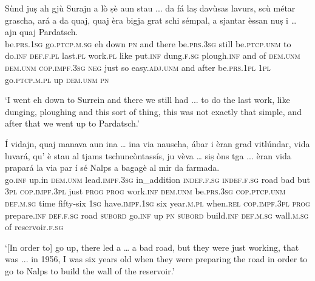 \begin{linenumbers}
\gll   Sùnd juṣ ah gjù Surajn a lò ṣè aun stau ... da fá laṣ davùsas lavurs, scù métar grascha, ará a da quaj, quaj èra bigja grat schi sémpal, a sjantar èssan nuṣ i … ajn quaj Pardatsch. \\
 be.\textsc{prs.1sg} go.\textsc{ptcp.m.sg} eh down \textsc{pn} and there be.\textsc{prs.3sg}  still be.\textsc{ptcp.unm} {} to do.\textsc{inf} \textsc{def.f.pl} last.\textsc{pl} work.\textsc{pl} like put.\textsc{inf} dung.\textsc{f.sg}  plough.\textsc{inf} and of \textsc{dem.unm} \textsc{dem.unm}  \textsc{cop.impf.3sg} \textsc{neg} just so easy.\textsc{adj.unm} and after be.\textsc{prs.1pl} \textsc{1pl} go.\textsc{ptcp.m.pl} {} up \textsc{dem.unm} \textsc{pn}\\
\end{linenumbers}
\medskip
\glt `I went eh down to Surrein and there we still had ... to do the last work, like dunging, ploughing and this sort of thing, this was not exactly that simple, and after that we went up to Pardatsch.'
\medskip

\begin{linenumbers}
\gll Í vidajn, quaj manava aun ina … ina via nauscha, ábar i èran grad vitlúndar, vida luvará, qu’ è stau al tjams tschuncòntassís, ju vèva … siṣ òns tga ... èran vida prapará la via par í sé Nalps a bagagè al mir da farmada.   \\
 go.\textsc{inf} up.in \textsc{dem.unm} lead.\textsc{impf.3sg} in\_addition  \textsc{indef.f.sg} {} \textsc{indef.f.sg} road bad but \textsc{3pl} \textsc{cop.impf.3pl} just \textsc{prog} \textsc{prog} work.\textsc{inf} \textsc{dem.unm} be.\textsc{prs.3sg} \textsc{cop.ptcp.unm} \textsc{def.m.sg}  time fifty-six \textsc{1sg} have.\textsc{impf.1sg} {} six year.\textsc{m.pl} when.\textsc{rel} {} \textsc{cop.impf.3pl} \textsc{prog} prepare.\textsc{inf} \textsc{def.f.sg} road \textsc{subord} go.\textsc{inf} up \textsc{pn} \textsc{subord} build.\textsc{inf} \textsc{def.m.sg} wall.\textsc{m.sg} of reservoir.\textsc{f.sg} \\ 
\end{linenumbers} 
\medskip
\glt `[In order to] go up, there led a … a bad road, but they were just working, that was ... in 1956, I was six years old when they were preparing the road in order to go to Nalps to build the wall of the reservoir.'
\medskip

